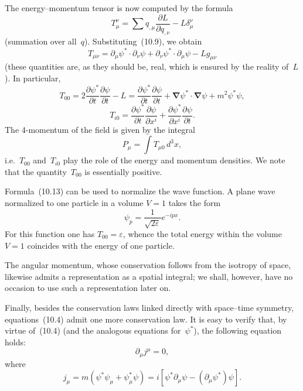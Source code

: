 The energy--momentum tensor is now computed by the formula
\begin{equation}
T^\nu_\mu = \sum q_{,\mu}\frac{\partial L}{\partial q_{,\nu}} - L\delta^\nu_\mu
\tag{10.11}
\end{equation}
(summation over all~$q$). Substituting~(10.9), we obtain
\begin{equation}
T_{\mu\nu} = \partial_\mu\psi^* \cdot \partial_\nu\psi + \partial_\nu\psi^* \cdot \partial_\mu\psi - Lg_{\mu\nu}
\tag{10.12}
\end{equation}
(these quantities are, as they should be, real, which is ensured by the reality of~$L$). In particular,
\begin{equation}
T_{00} = 2\frac{\partial\psi^*}{\partial t}\frac{\partial\psi}{\partial t} - L = \frac{\partial\psi^*}{\partial t}\frac{\partial\psi}{\partial t} + \boldsymbol{\nabla}\psi^* \cdot \boldsymbol{\nabla}\psi + m^2\psi^*\psi,
\tag{10.13}
\end{equation}
\begin{equation}
T_{i0} = \frac{\partial\psi^*}{\partial t}\frac{\partial\psi}{\partial x^i} + \frac{\partial\psi^*}{\partial x^i}\frac{\partial\psi}{\partial t}.
\tag{10.14}
\end{equation}
The 4-momentum of the field is given by the integral
\begin{equation}
P_\mu = \int T_{\mu 0}\,d^3x,
\tag{10.15}
\end{equation}
i.e.\ $T_{00}$ and~$T_{i0}$ play the role of the energy and momentum densities. We note that the quantity~$T_{00}$ is essentially positive.

Formula~(10.13) can be used to normalize the wave function. A plane wave normalized to one particle in a volume $V = 1$ takes the form
\begin{equation}
\psi_p = \frac{1}{\sqrt{2\varepsilon}}e^{-ipx}.
\tag{10.16}
\end{equation}
For this function one has $T_{00} = \varepsilon$, whence the total energy within the volume $V = 1$ coincides with the energy of one particle.

The angular momentum, whose conservation follows from the isotropy of space, likewise admits a representation as a spatial integral; we shall, however, have no occasion to use such a representation later on.

Finally, besides the conservation laws linked directly with space--time symmetry, equations~(10.4) admit one more conservation law. It is easy to verify that, by virtue of~(10.4) (and the analogous equations for~$\psi^*$), the following equation holds:
\begin{equation}
\partial_\mu j^\mu = 0,
\tag{10.17}
\end{equation}
where
\begin{equation}
j_\mu = m(\psi^*\psi_\mu + \psi^*_\mu\psi) = i[\psi^*\partial_\mu\psi - (\partial_\mu\psi^*)\psi].
\tag{10.18}
\end{equation}

